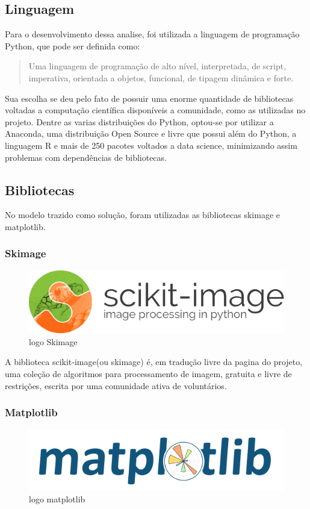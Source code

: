 \documentclass[journal]{IEEEtran}
\begin{document}
\subsection{Linguagem}
    Para o desenvolvimento dessa analise, foi utilizada a linguagem de programação Python, que pode ser definida como:
\begin{quotation}Uma linguagem de programação de alto nível, interpretada, de script, imperativa, orientada a objetos, funcional, de tipagem dinâmica e forte.
\end{quotation}

Sua escolha se deu pelo fato de possuir uma enorme quantidade de bibliotecas voltadas a computação científica disponíveis a comunidade, como as utilizadas no projeto.
Dentre as varias distribuições do Python, optou-se por utilizar a Anaconda, uma distribuição Open Source e livre que possui além do Python, a linguagem R e mais de 250 pacotes voltados a data science, minimizando assim problemas com dependências de bibliotecas. 
\subsection{Bibliotecas}
No modelo trazido como solução, foram utilizadas as bibliotecas skimage e matplotlib.

\subsubsection{Skimage}

\begin{figure}[!ht]
	\centering
	\includegraphics[scale=0.3]{logo}
	\caption{logo Skimage}
\end{figure}
A biblioteca scikit-image(ou skimage) é, em tradução livre da pagina do projeto, uma coleção de algoritmos para processamento de imagem, gratuita e livre de restrições, escrita por uma comunidade ativa de voluntários. 

\subsubsection{Matplotlib}

\begin{figure}[!ht]
	\centering
	\includegraphics[scale=0.3]{logo2}
	\caption{logo matplotlib}
\end{figure}
\end{document}
